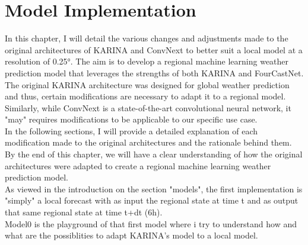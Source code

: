 \chapter{Model Implementation}

In this chapter, I will detail the various changes and adjustments made to the original architectures of KARINA and ConvNext to better suit a local model at a resolution of 0.25°. The aim is to develop a regional machine learning weather prediction model that leverages the strengths of both KARINA and FourCastNet.\\

The original KARINA architecture was designed for global weather prediction and thus, certain modifications are necessary to adapt it to a regional model. Similarly, while ConvNext is a state-of-the-art convolutional neural network, it "may" requires modifications to be applicable to our specific use case.\\

In the following sections, I will provide a detailed explanation of each modification made to the original architectures and the rationale behind them. By the end of this chapter, we will have a clear understanding of how the original architectures were adapted to create a regional machine learning weather prediction model.\\

As viewed in the introduction on the section "models", the first implementation is "simply" a local forecast with as input the regional state at time t and as output that same regional state at time t+dt (6h).\\

Model0 is the playground of that first model where i try to understand how and what are the possiblities to adapt KARINA's model to a local model.\\


\newpage